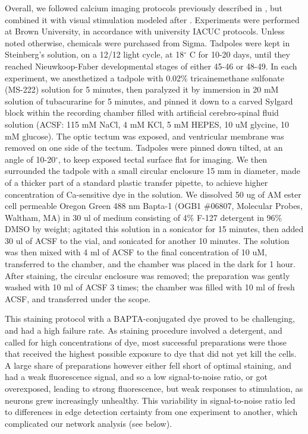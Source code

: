 \documentclass{article}
\begin{document}
Overall, we followed calcium imaging protocols previously described in \citep{xu2011, truszkowski2017}, but combined it with visual stimulation modeled after \citep{khakhalin2014}. Experiments were performed at Brown University, in accordance with university IACUC protocols. Unless noted otherwise, chemicals were purchased from Sigma. Tadpoles were kept in Steinberg’s solution, on a 12/12 light cycle, at 18$^\circ$ C for 10-20 days, until they reached Nieuwkoop-Faber developmental stages of either 45-46 or 48-49. In each experiment, we anesthetized a tadpole with 0.02\% tricainemethane sulfonate (MS-222) solution for 5 minutes, then paralyzed it by immersion in 20 mM solution of tubacurarine for 5 minutes, and pinned it down to a carved Sylgard block within the recording chamber filled with artificial cerebro-spinal fluid solution (ACSF: 115 mM NaCl, 4 mM KCl, 5 mM HEPES, 10 uM glycine, 10 mM glucose). The optic tectum was exposed, and ventricular membrane was removed on one side of the tectum. Tadpoles were pinned down tilted, at an angle of 10-20$^\circ$, to keep exposed tectal surface flat for imaging. We then surrounded the tadpole with a small circular enclosure 15 mm in diameter, made of a thicker part of a standard plastic transfer pipette, to achieve higher concentration of Ca-sensitive dye in the solution. We dissolved 50 ug of AM ester cell permeable Oregon Green 488 nm Bapta-1 (OGB1 $\#$06807, Molecular Probes, Waltham, MA) in 30 ul of medium consisting of 4\% F-127 detergent in 96\% DMSO by weight; agitated this solution in a sonicator for 15 minutes, then added 30 ul of ACSF to the vial, and sonicated for another 10 minutes. The solution was then mixed with 4 ml of ACSF to the final concentration of 10 uM, transferred to the chamber, and the chamber was placed in the dark for 1 hour. After staining, the circular enclosure was removed; the preparation was gently washed with 10 ml of ACSF 3 times; the chamber was filled with 10 ml of fresh ACSF, and transferred under the scope.

This staining protocol with a BAPTA-conjugated dye proved to be challenging, and had a high failure rate. As staining procedure involved a detergent, and called for high concentrations of dye, most successful preparations were those that received the highest possible exposure to dye that did not yet kill the cells. A large share of preparations however either fell short of optimal staining, and had a weak fluorescence signal, and so a low signal-to-noise ratio, or got overexposed, leading to strong fluorescence, but weak responses to stimulation, as neurons grew increasingly unhealthy. This variability in signal-to-noise ratio led to  differences in edge detection certainty from one experiment to another, which complicated our network analysis (see below).
\end{document}

